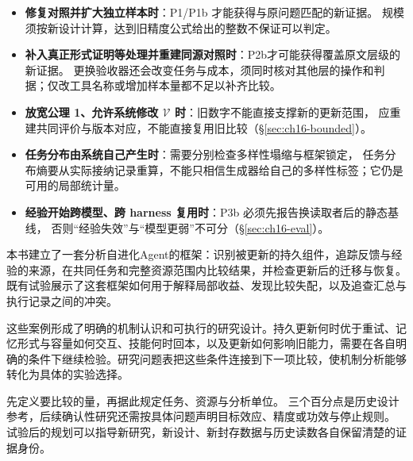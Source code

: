 \begin{itemize}
  \item \textbf{修复对照并扩大独立样本时}：P1/P1b 才能获得与原问题匹配的新证据。
        规模须按新设计计算，达到旧精度公式给出的整数不保证可以判定。
  \item \textbf{补入真正形式证明等处理并重建同源对照时}：P2b才可能获得覆盖原文层级的新证据。
        更换验收器还会改变任务与成本，须同时核对其他层的操作和判据；仅改工具名称或增加样本量都不足以补齐比较。
  \item \textbf{放宽公理 1、允许系统修改 $\mathcal V$ 时}：旧数字不能直接支撑新的更新范围，
        应重建共同评价与版本对应，不能直接复用旧比较（\S\ref{sec:ch16-bounded}）。
  \item \textbf{任务分布由系统自己产生时}：需要分别检查多样性塌缩与框架锁定，
        任务分布熵要从实际接纳记录重算，不能只相信生成器给自己的多样性标签；它仍是可用的局部统计量。
  \item \textbf{经验开始跨模型、跨 harness 复用时}：P3b 必须先报告换读取者后的静态基线，
        否则“经验失效”与“模型更弱”不可分（\S\ref{sec:ch16-eval}）。
\end{itemize}

\label{sec:ch16-claims}

本书建立了一套分析自进化Agent的框架：识别被更新的持久组件，追踪反馈与经验的来源，在共同任务和完整资源范围内比较结果，并检查更新后的迁移与恢复。既有试验展示了这套框架如何用于解释局部收益、发现比较失配，以及追查汇总与执行记录之间的冲突。

这些案例形成了明确的机制认识和可执行的研究设计。持久更新何时优于重试、记忆形式与容量如何交互、技能何时回本，以及更新如何影响旧能力，需要在各自明确的条件下继续检验。研究问题表把这些条件连接到下一项比较，使机制分析能够转化为具体的实验选择。

\begin{principlebox}
先定义要比较的量，再据此规定任务、资源与分析单位。
三个百分点是历史设计参考，后续确认性研究还需按具体问题声明目标效应、精度或功效与停止规则。
试验后的规划可以指导新研究，新设计、新封存数据与历史读数各自保留清楚的证据身份。
\end{principlebox}




